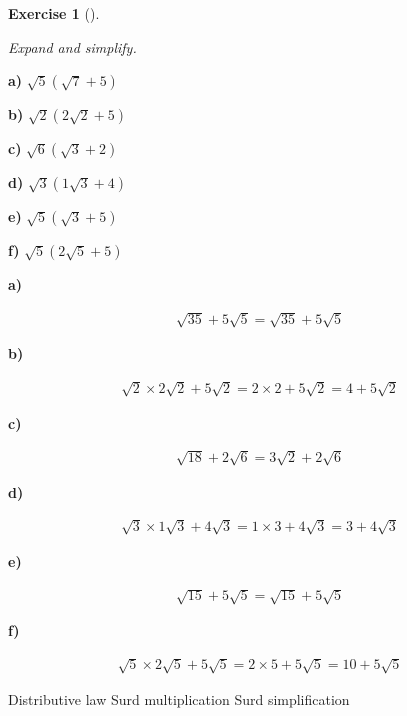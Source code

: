 \documentclass[
  letterpaper,
  DIV=11,
  numbers=noendperiod]{scrreprt}
\theoremstyle{definition}
\newtheorem{exercise}{Exercise}[chapter]
\theoremstyle{remark}
\begin{document}
\begin{exercise}[]\protect\hypertarget{exr-u2-46}{}\label{exr-u2-46}

\emph{Expand and simplify.}

\textbf{a)} \(\displaystyle \sqrt{5}(\sqrt{7} + 5)\)

\textbf{b)} \(\displaystyle \sqrt{2}(2\sqrt{2} + 5)\)

\textbf{c)} \(\displaystyle \sqrt{6}(\sqrt{3} + 2)\)

\textbf{d)} \(\displaystyle \sqrt{3}(1\sqrt{3} + 4)\)

\textbf{e)} \(\displaystyle \sqrt{5}(\sqrt{3} + 5)\)

\textbf{f)} \(\displaystyle \sqrt{5}(2\sqrt{5} + 5)\)

\begin{tcolorbox}[enhanced jigsaw, opacitybacktitle=0.6, coltitle=black, arc=.35mm, colframe=quarto-callout-tip-color-frame, colback=white, bottomrule=.15mm, left=2mm, colbacktitle=quarto-callout-tip-color!10!white, titlerule=0mm, opacityback=0, title=\textcolor{quarto-callout-tip-color}{\faLightbulb}\hspace{0.5em}{🔍 View Solutions}, leftrule=.75mm, breakable, rightrule=.15mm, bottomtitle=1mm, toptitle=1mm, toprule=.15mm]

\textbf{a)}

\[
\begin{aligned}
\sqrt{35} + 5\sqrt{5} = \sqrt{35} + 5\sqrt{5}
\end{aligned}
\]

\textbf{b)}

\[
\begin{aligned}
\sqrt{2}\times 2\sqrt{2} + 5\sqrt{2} = 2\times 2 + 5\sqrt{2} = 4 + 5\sqrt{2}
\end{aligned}
\]

\textbf{c)}

\[
\begin{aligned}
\sqrt{18} + 2\sqrt{6} = 3\sqrt{2} + 2\sqrt{6}
\end{aligned}
\]

\textbf{d)}

\[
\begin{aligned}
\sqrt{3}\times 1\sqrt{3} + 4\sqrt{3} = 1\times 3 + 4\sqrt{3} = 3 + 4\sqrt{3}
\end{aligned}
\]

\textbf{e)}

\[
\begin{aligned}
\sqrt{15} + 5\sqrt{5} = \sqrt{15} + 5\sqrt{5}
\end{aligned}
\]

\textbf{f)}

\[
\begin{aligned}
\sqrt{5}\times 2\sqrt{5} + 5\sqrt{5} = 2\times 5 + 5\sqrt{5} = 10 + 5\sqrt{5}
\end{aligned}
\]

\end{tcolorbox}

{Distributive law} {Surd multiplication} {Surd simplification}

\end{exercise}
\end{document}
